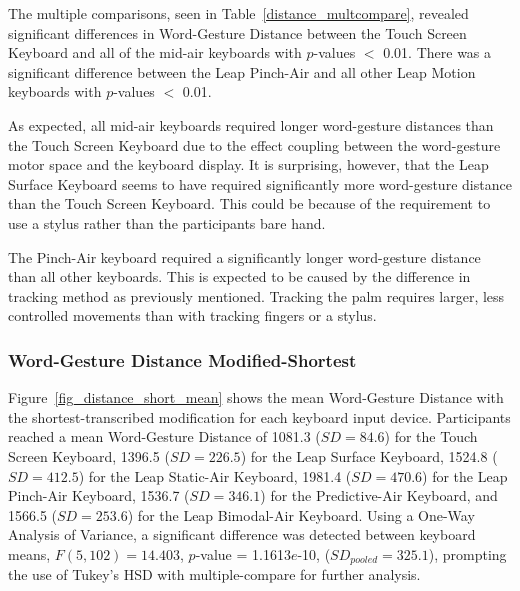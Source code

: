 The multiple comparisons, seen in Table~\ref{distance_multcompare}, revealed significant differences in Word-Gesture Distance between the Touch Screen Keyboard and all of the mid-air keyboards with $p$-values $<$ 0.01. There was a significant difference between the Leap Pinch-Air and all other Leap Motion keyboards with $p$-values $<$ 0.01.

As expected, all mid-air keyboards required longer word-gesture distances than the Touch Screen Keyboard due to the effect coupling between the word-gesture motor space and the keyboard display. It is surprising, however, that the Leap Surface Keyboard seems to have required significantly more word-gesture distance than the Touch Screen Keyboard. This could be because of the requirement to use a stylus rather than the participants bare hand.

The Pinch-Air keyboard required a significantly longer word-gesture distance than all other keyboards. This is expected to be caused by the difference in tracking method as previously mentioned. Tracking the palm requires larger, less controlled movements than with tracking fingers or a stylus.

\subsubsection{Word-Gesture Distance Modified-Shortest}
Figure~\ref{fig_distance_short_mean} shows the mean Word-Gesture Distance with the shortest-transcribed modification for each keyboard input device. Participants reached a mean Word-Gesture Distance of 1081.3 ($SD = 84.6$) for the Touch Screen Keyboard, 1396.5 ($SD = 226.5$) for the Leap Surface Keyboard, 1524.8 ($SD = 412.5$) for the Leap Static-Air Keyboard, 1981.4 ($SD = 470.6$) for the Leap Pinch-Air Keyboard, 1536.7 ($SD = 346.1$) for the Predictive-Air Keyboard, and 1566.5 ($SD = 253.6$) for the Leap Bimodal-Air Keyboard. Using a One-Way Analysis of Variance, a significant difference was detected between keyboard means, $F(5, 102) = 14.403$, $p$-value = 1.1613$e$-10, ($SD_{pooled} = 325.1$), prompting the use of Tukey's HSD with multiple-compare for further analysis.

